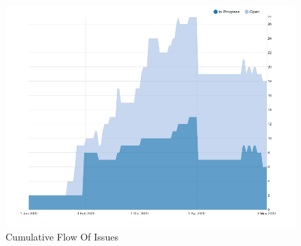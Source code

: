 \begin{figure}[h!]
    \caption{Cumulative Flow Of Issues}
    \label{image:cumFlow}
    \centering
    \includegraphics[width=1.0\textwidth]{images/FlowCumulative.png}
\end{figure}